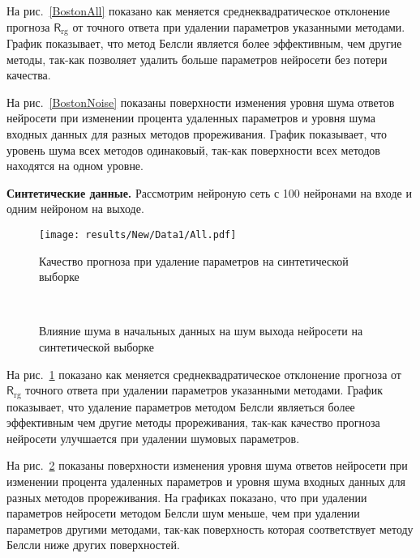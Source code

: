 На рис.~\ref{BostonAll} показано как меняется среднеквадратическое отклонение прогноза $\mathsf{R}_{\text{rg}}$ от точного ответа  при удалении параметров указанными методами. График показывает, что метод Белсли является более эффективным, чем другие методы, так-как позволяет удалить больше параметров нейросети без потери качества.

На рис.~\ref{BostonNoise} показаны поверхности изменения уровня шума ответов нейросети при изменении процента удаленных параметров и уровня шума входных данных для разных методов прореживания. График показывает, что уровень шума всех методов одинаковый, так-как поверхности всех методов находятся на одном уровне.


\textbf{Синтетические данные. } Рассмотрим нейроную сеть с 100 нейронами на входе и одним нейроном на выходе.

\begin{figure}[h!t]\center
\texttt{[image: results/New/Data1/All.pdf]}\\
\caption{Качество прогноза при удаление параметров на синтетической выборке}
\label{Data1All}
\end{figure}

\begin{figure}[h!t]\center
{}
\\
\caption{Влияние шума в начальных данных на шум выхода нейросети на синтетической выборке}
\label{Data1Noise}
\end{figure}

На рис.~\ref{Data1All} показано как меняется среднеквадратическое отклонение прогноза от $\mathsf{R}_{\text{rg}}$ точного ответа при удалении параметров указанными методами. График показывает, что удаление параметров методом Белсли являеться более эффективным чем другие методы прореживания, так-как качество прогноза нейросети улучшается при удалении шумовых параметров.

На рис.~\ref{Data1Noise} показаны поверхности изменения уровня шума ответов нейросети при изменении процента удаленных параметров и уровня шума входных данных для разных методов прореживания. На графиках показано, что при удалении параметров нейросети методом Белсли шум меньше, чем при удалении параметров другими методами, так-как поверхность которая соответствует методу Белсли ниже других поверхностей.



